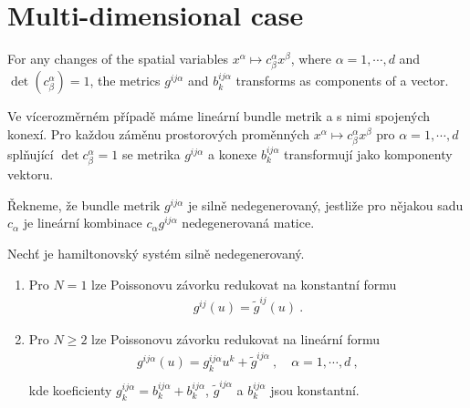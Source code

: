 \section{Multi-dimensional case}

\begin{proposition}
    For any changes of the spatial variables $x^ \alpha \mapsto c^\alpha_\beta x^\beta$, where $\alpha = 1, \cdots, d$ and $\det (c^\alpha_\beta) = 1$, the metrics $g^{ij \alpha}$ and $b^{ij \alpha}_k$ transforms as components of a vector.
\end{proposition}



Ve vícerozměrném případě máme lineární bundle metrik a s nimi spojených konexí. Pro každou záměnu prostorových proměnných $x^\alpha \mapsto c^\alpha_\beta x^\beta$ pro $\alpha = 1, \cdots, d$ splňující $\det c^\alpha_\beta = 1$ se metrika $g^{ij \alpha}$ a konexe $b^{ij \alpha}_k$ transformují jako komponenty vektoru.

\begin{definition}
    Řekneme, že bundle metrik $g^{ij \alpha}$ je silně nedegenerovaný, jestliže pro nějakou sadu $c_\alpha$ je lineární kombinace $c_\alpha g^{ij \alpha}$ nedegenerovaná matice.
\end{definition}

\begin{theorem}
    Nechť je hamiltonovský systém silně nedegenerovaný.
    \begin{enumerate}
        \item Pro $N=1$ lze Poissonovu závorku redukovat na konstantní formu
        \begin{align}
            g^{ij}(u) = \tilde g^{ij}(u) \:.
        \end{align}

        \item Pro $N \geq 2$ lze Poissonovu závorku redukovat na lineární formu
        \begin{align}
            g^{ij \alpha}(u) = g^{ij \alpha}_k u^k + \tilde g^{ij \alpha} \:, \quad \alpha = 1, \cdots , d \:, \\
        \end{align}
        kde koeficienty $g^{ij \alpha}_k = b^{ij \alpha}_k + b^{ij \alpha}_k$, $\tilde g^{ij \alpha}$ a $b^{ij \alpha}_k$ jsou konstantní.
    \end{enumerate}
\end{theorem}
